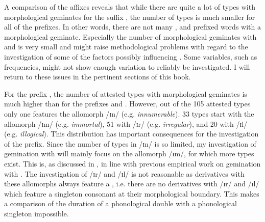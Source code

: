 A comparison of the affixes reveals that while there are quite a lot of types with morphological geminates for the suffix , the number of types is much smaller for all of the prefixes. In other words, there are not many ,  and prefixed words with a {morphological geminate}. Especially the number of morphological geminates with  and  is very small and might raise methodological problems with regard to the investigation of some of the factors possibly influencing . Some variables, such as frequencies, might not show enough variation to reliably be investigated. I will return to these issues in the pertinent sections of this book.

For the prefix , the number of attested types with morphological geminates is much higher than for the prefixes  and . However, out of the 105 attested types only one features the allomorph /ɪn/ (e.g. \textit{innumerable}). 33 types start with the allomorph /ɪm/ (e.g. \textit{immortal}), 51 with /ɪr/ (e.g. \textit{irregular}), and 20 with /ɪl/ (e.g. \textit{illogical}). 
This distribution has important consequences for the investigation of the prefix. Since the number of types in /ɪn/ is so limited, my investigation of gemination with  will mainly focus on the allomorph /ɪm/, for which more types exist. This is, as discussed in , in line with previous empirical work on gemination with .
The investigation of /ɪr/  and /ɪl/ is not reasonable as derivatives with these allomorphs always feature a , i.e. there are no derivatives with /ɪr/  and /ɪl/ which feature a singleton consonant at their morphological boundary. This makes a comparison of the duration of a phonological double with a phonological singleton impossible.
